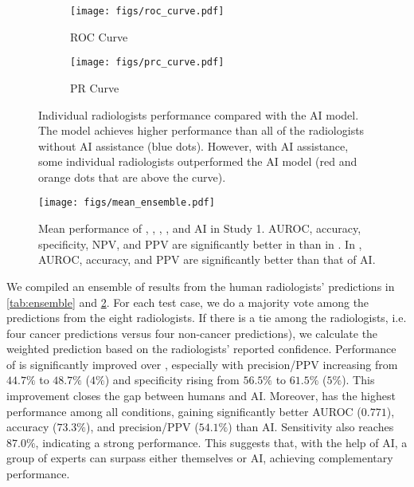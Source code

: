 \begin{figure}[t]
  \centering
  \begin{subfigure}[b]{0.4\textwidth}
    \centering
    \texttt{[image: figs/roc\_curve.pdf]}
    \caption{ROC Curve}
  \end{subfigure}
  \begin{subfigure}[b]{0.4\textwidth}
    \centering
    \texttt{[image: figs/prc\_curve.pdf]}
    \caption{PR Curve}
  \end{subfigure}
  
  \caption{Individual radiologists performance compared with the AI model. The model achieves higher performance than all of the radiologists without AI assistance (blue dots). However, with AI assistance, some individual radiologists outperformed the AI model (red and orange dots that are above the curve).
  }
  \label{fig:two_side_by_side}
\end{figure}






\begin{figure}[ht]
    \centering
    \texttt{[image: figs/mean\_ensemble.pdf]}
    \caption{
        Mean performance of \halone, \hai, \hensem, \haiensem, and AI in Study 1.
        AUROC, accuracy, specificity, NPV, and PPV are significantly better in \hensem than in \halone.
        In \haiensem, AUROC, accuracy, and PPV are significantly better than that of AI.
    }
    \label{fig:ensemble}
\end{figure}

 We compiled an ensemble of results from the human radiologists' predictions in \cref{tab:ensemble} and \cref{fig:ensemble}.
For each test case, we do a majority vote among the predictions from the eight radiologists.
If there is a tie among the radiologists, i.e. four cancer predictions versus four non-cancer predictions), we calculate the weighted prediction based on the radiologists' reported confidence.
Performance of \hensem is significantly improved over \halone, especially with precision/PPV increasing from $44.7\%$ to $48.7\%$ ($4\%$) and specificity rising from $56.5\%$ to $61.5\%$ ($5\%$).
This improvement closes the gap between humans and AI.
Moreover, \haiensem has the highest performance among all conditions, gaining significantly better AUROC ($0.771$), accuracy ($73.3\%$), and precision/PPV ($54.1\%$) than AI.
Sensitivity also reaches $87.0\%$, indicating a strong performance. 
This suggests that, with the help of AI, a group of experts can surpass either themselves or AI, achieving complementary performance.



